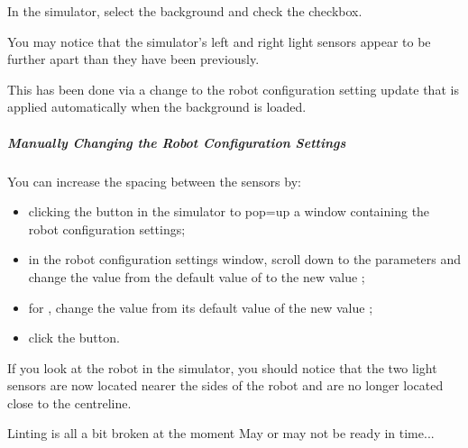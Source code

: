 \documentclass[letterpaper,10pt,english]{sphinxmanual}
\begin{document}
{In the simulator, select the  background and check the  checkbox.

You may notice that the simulator’s left and right light sensors appear to be further apart than they have been previously.

This has been done via a change to the robot configuration setting update that is applied automatically when the  background is loaded.


\subparagraph{Manually Changing the Robot Configuration Settings}
\label{\detokenize{content/03_Robot_Lab/Section_00_03:Manually-Changing-the-Robot-Configuration-Settings}}
You can increase the spacing between the sensors by:
\begin{itemize}
\item {} 
clicking the  button in the simulator to pop=up a window containing the robot configuration settings;

\item {} 
in the robot configuration settings window, scroll down to the  parameters and change the  value from the default value of  to the new value ;

\item {} 
for , change the  value from its default value of  the new value ;

\item {} 
click the  button.

\end{itemize}

If you look at the robot in the simulator, you should notice that the two light sensors are now located nearer the sides of the robot and are no longer located close to the centreline.

{
\begin{sphinxVerbatim}[commandchars=\\\{\}]
\llap{\color{nbsphinxin}[ ]:\,\hspace{\fboxrule}\hspace{\fboxsep}}\PYGZsh{} Linting is all a bit broken at the moment
\PYGZsh{} May or may not be ready in time...


\end{sphinxVerbatim}}}
\end{document}
